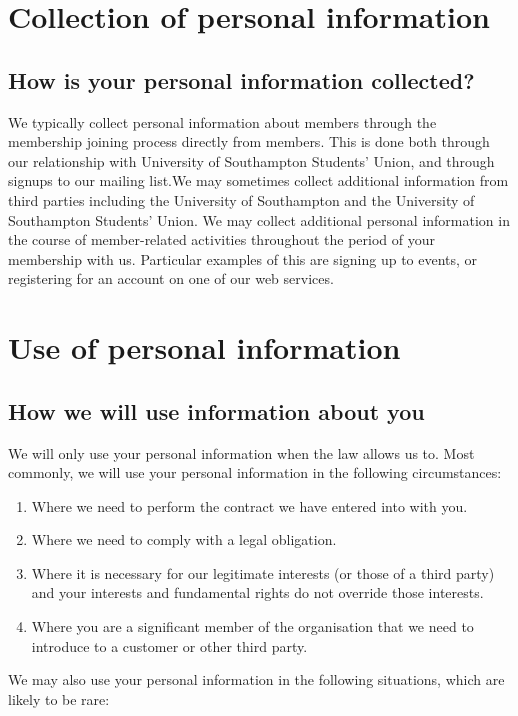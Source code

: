 \documentclass[12pt]{article}
\begin{document}
\section{Collection of personal information}

\subsection{How is your personal information collected?}

We typically collect personal information about members through the membership joining process directly from members. This is done both through our relationship with University of Southampton Students' Union, and through signups to our mailing list.We may sometimes collect additional information from third parties including the University of Southampton and the University of Southampton Students’ Union. 
We may collect additional personal information in the course of member-related activities throughout the period of your membership with us. Particular examples of this are signing up to events, or registering for an account on one of our web services.

\section{Use of personal information}


\subsection{How we will use information about you}
We will only use your personal information when the law allows us to. Most commonly, we will use your personal information in the following circumstances:

\begin{enumerate}
\item Where we need to perform the contract we have entered into with you.
\item Where we need to comply with a legal obligation.
\item Where it is necessary for our legitimate interests (or those of a third party) and your interests and fundamental rights do not override those interests. 
\item Where you are a significant member of the organisation that we need to introduce to a customer or other third party.
\end{enumerate}

We may also use your personal information in the following situations, which are likely to be rare:
\end{document}
